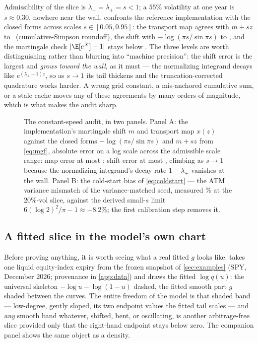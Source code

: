 Admissibility of the slice is $\lambda_-=\lambda_+=s<1$; a $55\%$
volatility at one year is $s\approx0.30$, nowhere near the wall.
 confronts the reference implementation with the closed
forms across scales $s\in[0.05,0.95]$: the transport map agrees with
$m+sz$ to \MacExactMapWorst\ (cumulative-Simpson roundoff), the shift
with $-\log(\pi s/\sin\pi s)$ to \MacExactMuWorst, and the martingale
check $|\E[e^{X}]-1|$ stays below \MacExactMartWorst.  The three levels
are worth distinguishing rather than blurring into ``machine
precision'': the shift error is the largest and \emph{grows toward the
wall}, as it must --- the normalizing integrand decays like
$e^{(\lambda_+-1)z}$, so as $s\to1$ its tail thickens and the
truncation-corrected quadrature works harder.  A wrong grid constant, a
mis-anchored cumulative sum, or a stale cache moves any of these
agreements by many orders of magnitude, which is what makes the audit
sharp.

\begin{figure}[htbp]
\centering
{}
\caption{The constant-speed audit, in two panels.  Panel A: the
implementation's martingale shift $m$ and transport map $x(z)$ against
the closed forms $-\log(\pi s/\sin\pi s)$ and $m+sz$ from
\eqref{eq:mgf}, absolute error on a log scale across the admissible
scale range: map error at most \MacExactMapWorst; shift error at most
\MacExactMuWorst, climbing as $s\to1$ because the normalizing
integrand's decay rate $1-\lambda_+$ vanishes at the wall.  Panel B:
the cold-start bias of \eqref{eq:coldstart} --- the ATM variance
mismatch of the variance-matched seed, measured
\MacColdStartMismatchPct\% at the $20\%$-vol slice, against the derived
small-$s$ limit $6(\log2)^2/\pi-1\approx-8.2\%$; the first calibration
step removes it.}
\label{fig:exact}
\end{figure}

\subsection{A fitted slice in the model's own chart}

Before proving anything, it is worth seeing what a real fitted $g$ looks
like.   takes one liquid equity-index expiry from the
frozen snapshot of \cref{sec:examples} (SPY, December 2026; provenance in
\cref{app:data}) and draws the fitted $\log q(u)$: the universal skeleton
$-\log u-\log(1-u)$ dashed, the fitted smooth part $g$ shaded between the
curves.  The entire freedom of the model is that shaded band ---
low-degree, gently sloped, its two endpoint values the fitted tail scales
--- and \emph{any} smooth band whatever, shifted, bent, or oscillating, is
another arbitrage-free slice provided only that the right-hand endpoint
stays below zero.  The companion panel shows the same object as a density.

